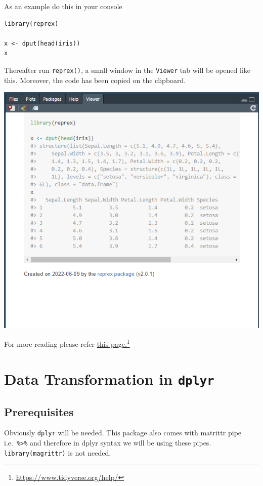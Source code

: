 \documentclass[
]{book}
\begin{document}
As an example do this in your console

\begin{verbatim}
library(reprex)

x <- dput(head(iris))
x
\end{verbatim}

Thereafter run \texttt{reprex()}, a small window in the \texttt{Viewer} tab will be opened like this. Moreover, the code has been copied on the clipboard.

\includegraphics{images/reprex.png}

For more reading please refer \href{https://www.tidyverse.org/help/}{this page.}\footnote{\url{https://www.tidyverse.org/help/}}

\hypertarget{data-transformation-in-dplyr}{%
\chapter{\texorpdfstring{Data Transformation in \texttt{dplyr}}{Data Transformation in dplyr}}\label{data-transformation-in-dplyr}}

\hypertarget{prerequisites-1}{%
\section{Prerequisites}\label{prerequisites-1}}

Obviously \texttt{dplyr} \citep{R-dplyr} will be needed. This package also comes with matrittr pipe i.e.~\texttt{\%\textgreater{}\%} and therefore in dplyr syntax we will be using these pipes. \texttt{library(magrittr)} is not needed.
\end{document}
